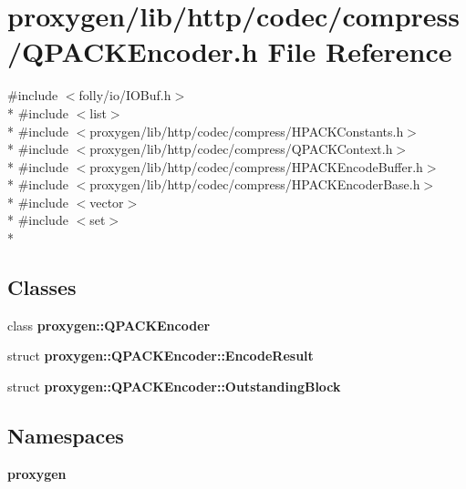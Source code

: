 \section{proxygen/lib/http/codec/compress/\+Q\+P\+A\+C\+K\+Encoder.h File Reference}
\label{QPACKEncoder_8h}
{\ttfamily \#include $<$folly/io/\+I\+O\+Buf.\+h$>$}\\*
{\ttfamily \#include $<$list$>$}\\*
{\ttfamily \#include $<$proxygen/lib/http/codec/compress/\+H\+P\+A\+C\+K\+Constants.\+h$>$}\\*
{\ttfamily \#include $<$proxygen/lib/http/codec/compress/\+Q\+P\+A\+C\+K\+Context.\+h$>$}\\*
{\ttfamily \#include $<$proxygen/lib/http/codec/compress/\+H\+P\+A\+C\+K\+Encode\+Buffer.\+h$>$}\\*
{\ttfamily \#include $<$proxygen/lib/http/codec/compress/\+H\+P\+A\+C\+K\+Encoder\+Base.\+h$>$}\\*
{\ttfamily \#include $<$vector$>$}\\*
{\ttfamily \#include $<$set$>$}\\*
\subsection*{Classes}
\begin{DoxyCompactItemize}
\item 
class {\bf proxygen\+::\+Q\+P\+A\+C\+K\+Encoder}
\item 
struct {\bf proxygen\+::\+Q\+P\+A\+C\+K\+Encoder\+::\+Encode\+Result}
\item 
struct {\bf proxygen\+::\+Q\+P\+A\+C\+K\+Encoder\+::\+Outstanding\+Block}
\end{DoxyCompactItemize}
\subsection*{Namespaces}
\begin{DoxyCompactItemize}
\item 
 {\bf proxygen}
\end{DoxyCompactItemize}
